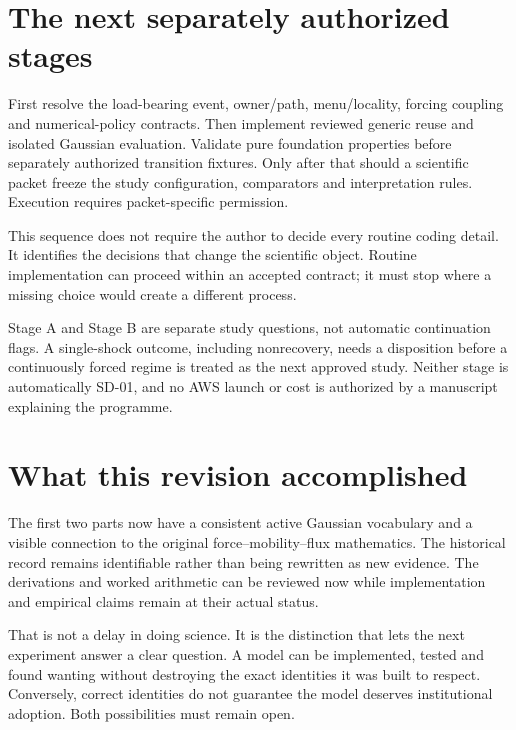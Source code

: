 \section{The next separately authorized stages}
First resolve the load-bearing event, owner/path, menu/locality, forcing
coupling and numerical-policy contracts. Then implement reviewed generic
reuse and isolated Gaussian evaluation. Validate pure foundation properties
before separately authorized transition fixtures. Only after that should a
scientific packet freeze the study configuration, comparators and
interpretation rules. Execution requires packet-specific permission.

This sequence does not require the author to decide every routine coding
detail. It identifies the decisions that change the scientific object.
Routine implementation can proceed within an accepted contract; it must
stop where a missing choice would create a different process.

Stage A and Stage B are separate study questions, not automatic continuation
flags. A single-shock outcome, including nonrecovery, needs a disposition
before a continuously forced regime is treated as the next approved study.
Neither stage is automatically SD-01, and no AWS launch or cost is authorized
by a manuscript explaining the programme.

\section{What this revision accomplished}
The first two parts now have a consistent active Gaussian vocabulary and a
visible connection to the original force--mobility--flux mathematics. The
historical record remains identifiable rather than being rewritten as new
evidence. The derivations and worked arithmetic can be reviewed now while
implementation and empirical claims remain at their actual status.

That is not a delay in doing science. It is the distinction that lets the
next experiment answer a clear question. A model can be implemented, tested
and found wanting without destroying the exact identities it was built to
respect. Conversely, correct identities do not guarantee the model deserves
institutional adoption. Both possibilities must remain open.
